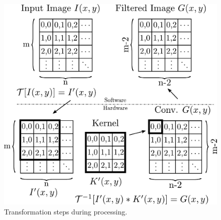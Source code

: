 \documentclass[conference,compsoc]{IEEEtran}
\begin{document}
\begin{figure}[!t]
\centering
\includegraphics[scale=0.47]{wflow3}
\caption{Transformation steps during processing.}
\label{transformation}
\end{figure}




\end{document}
